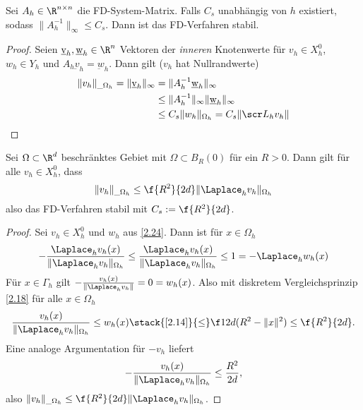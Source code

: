 \begin{st} \label{2.22}
	Sei $A_h \in \R^{n\times n}$ die FD-System-Matrix.
	Falls $C_s$ unabhängig von $h$ existiert, sodass $\|A_h^{-1}\|_\infty \le C_s$.
	Dann ist das FD-Verfahren stabil.
	\begin{proof}
		Seien $\underbar{v}_h, \underbar{w}_h \in \R^n$ Vektoren der \emph{inneren} Knotenwerte für $v_h \in X_h^0$, $w_h \in Y_h$ und $A_h \underbar{v}_h = \underbar{w}_h$.
		Dann gilt ($v_h$ hat Nullrandwerte)
		\begin{align*}
			\|v_h\|_{\_\Omega_h}
			= \|\underbar{v}_h\|_\infty
			&= \|A_h^{-1} \underbar{w}_h\|_\infty \\
			&\le \|A_h^{-1}\|_\infty \|\underbar{w}_h\|_\infty \\
			&\le C_s \|w_h\|_{\Omega_h}
			= C_s \|\scr L_h v_h\|
		\end{align*}
	\end{proof}
\end{st}

\begin{st} \label{2.23}
	Sei $\Omega \subset \R^d$ beschränktes Gebiet mit $\Omega \subset B_R(0)$ für ein $R > 0$.
	Dann gilt für alle $v_h \in X_h^0$, dass
	\[
		\|v_h\|_{\_\Omega_h} \le \f {R^2}{2d} \|\Laplace_h v_h\|_{\Omega_h}
	\]
	also das FD-Verfahren stabil mit $C_s := \f {R^2}{2d}$.
	\begin{proof}
		Sei $v_h \in X_h^0$ und $w_h$ aus \ref{2.24}.
		Dann ist für $x \in \Omega_h$
		\[
			- \frac{\Laplace_h v_h(x)}{\|\Laplace_h v_h\|_{\Omega_h}}
			\le \frac{\Laplace_h v_h(x)}{\|\Laplace_h v_h\|_{\Omega_h}}
			\le 1
			= - \Laplace_h w_h(x)
		\]
		Für $x \in \Gamma_h$ gilt $- \frac{v_h(x)}{\|\Laplace_h v_h\|} = 0 = w_h(x)$.
		Also mit diskretem Vergleichsprinzip \ref{2.18} für alle $x \in \Omega_h$
		\[
			\frac{v_h(x)}{\|\Laplace_h v_h\|_{\Omega_h}}
			\le w_h(x)
			\stack{\ref{2.14}}{\le} \f 1{2d} (R^2 - \|x\|^2)
			\le \f {R^2}{2d}.
		\]
		Eine analoge Argumentation für $-v_h$ liefert
		\[
			- \frac{v_h(x)}{\|\Laplace_h v_h\|_{\Omega_h}}
			\le \frac{R^2}{2d},
		\]
		also $\|v_h\|_{\_\Omega_h} \le \f {R^2}{2d} \|\Laplace_h v_h\|_{\Omega_h}$.
	\end{proof}
\end{st}

